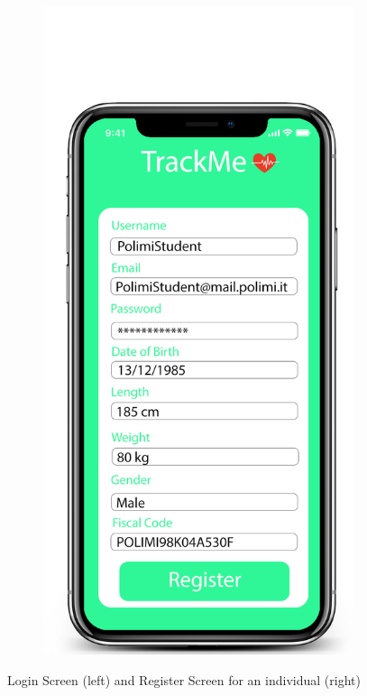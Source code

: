 \documentclass[12pt]{article}
\begin{document}
\begin{figure}[t!]
\begin{subfigure}{.4\textwidth}
    \end{subfigure}%
    \begin{subfigure}{.4\textwidth}
        \includegraphics[scale=0.2]{RegisterScreen-Individual.png}
        \label{fig:RegisterScreen-Individual}
    \end{subfigure}
    \caption{Login Screen (left) and  Register Screen for an individual (right)}
\end{figure}
\end{document}
